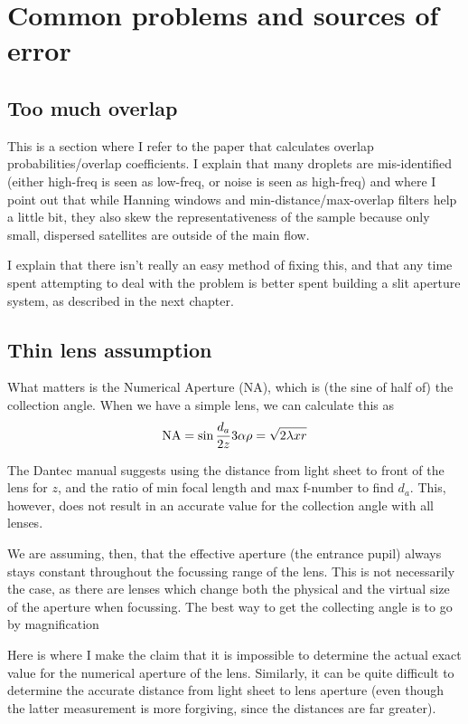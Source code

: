 \documentclass[11.5pt]{book}
\begin{document}
\section{Common problems and sources of error}
\subsection{Too much overlap}
\label{sec:ipi-overlap}
This is a section where I refer to the paper that calculates overlap
probabilities/overlap coefficients. I explain that many droplets are mis-identified (either high-freq
is seen as low-freq, or noise is seen as high-freq) and where I point out that
while Hanning windows and min-distance/max-overlap filters help a little bit,
they also skew the representativeness of the sample because only small,
dispersed satellites are outside of the main flow.

I explain that there isn't really an easy method of fixing this, and that any
time spent attempting to deal with the problem is better spent building a slit
aperture system, as described in the next chapter.

\subsection{Thin lens assumption}
What matters is the Numerical Aperture (NA), which is (the sine of half of) the
collection angle. When we have a simple lens, we can calculate this as
\begin{equation}
    \mathrm{NA} = \sin \frac{d_a}{2z}\\
    3\alpha \rho = \sqrt{2 \lambda x r}
\end{equation}

The Dantec manual suggests using the distance from light sheet to front of the
lens for $z$, and the ratio of min focal length and max f-number to find $d_a$.
This, however, does not result in an accurate value for the collection angle
with all lenses.

We are assuming, then, that the effective aperture (the entrance pupil) always
stays constant throughout the focussing range of the lens. This is not
necessarily the case, as there are lenses which change both the physical and the
virtual size of the aperture when focussing. The best way to get the collecting
angle is to go by magnification

Here is where I make the claim that it is impossible to determine the actual
exact value for the numerical aperture of the lens. Similarly, it can be quite
difficult to determine the accurate distance from light sheet to lens aperture
(even though the latter measurement is more forgiving, since the distances are
far greater).
\end{document}
